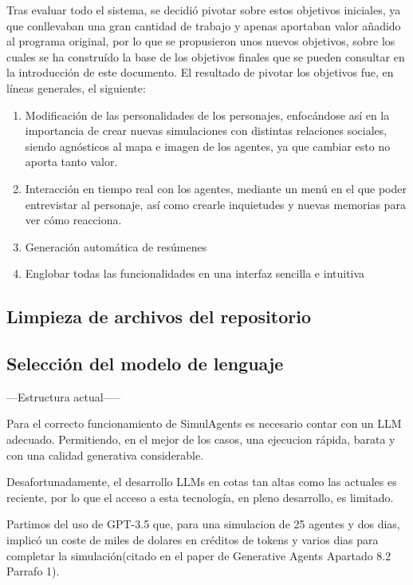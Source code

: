 Tras evaluar todo el sistema, se decidió pivotar sobre estos objetivos iniciales, ya que conllevaban una gran cantidad de trabajo y apenas aportaban valor añadido al programa original, por lo que se propusieron unos nuevos objetivos, sobre los cuales se ha construído la base de los objetivos finales que se pueden consultar en la introducción de este documento. El resultado de pivotar los objetivos fue, en líneas generales, el siguiente:

\begin{enumerate}
	\item Modificación de las personalidades de los personajes, enfocándose así en la importancia de crear nuevas simulaciones con distintas relaciones sociales, siendo agnósticos al mapa e imagen de los agentes, ya que cambiar esto no aporta tanto valor.
	
	\item Interacción en tiempo real con los agentes, mediante un menú en el que poder entrevistar al personaje, así como crearle inquietudes y nuevas memorias para ver cómo reacciona.
	
	\item Generación automática de resúmenes
	
	\item Englobar todas las funcionalidades en una interfaz sencilla e intuitiva
\end{enumerate}

\subsection{Limpieza de archivos del repositorio}

\subsection{Selección del modelo de lenguaje}

---Estructura actual-----

Para el correcto funcionamiento de SimulAgents es necesario contar con un LLM adecuado. Permitiendo, en el mejor de los casos, una ejecucion rápida, barata y con una calidad generativa considerable.

Desafortunadamente, el desarrollo LLMs en cotas tan altas como las actuales es reciente, por lo que el acceso a esta tecnología, en pleno desarrollo, es limitado.

Partimos del uso de GPT-3.5 que, para una simulacion de 25 agentes y dos dias, implicó un coste de miles de dolares en créditos de tokens y varios dias para completar la simulación(citado en el paper de Generative Agents Apartado 8.2 Parrafo 1).

